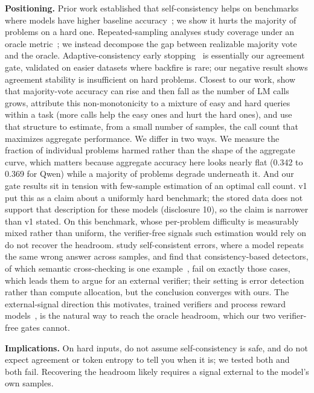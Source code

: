 \documentclass{article}
\begin{document}
\textbf{Positioning.} Prior work established that self-consistency helps on
benchmarks where models have higher baseline
accuracy~\citep{wang2023self}; we show it hurts the majority of problems on a
hard one. Repeated-sampling analyses study coverage under an oracle
metric~\citep{brown2024large}; we instead decompose the gap between realizable
majority vote and the oracle. Adaptive-consistency early
stopping~\citep{aggarwal2023adaptive} is essentially our agreement gate,
validated on easier datasets where backfire is rare; our negative result shows
agreement stability is insufficient on hard problems. Closest to our work,
\citet{chen2024more} show that majority-vote accuracy can rise and then fall
as the number of LM calls grows, attribute this non-monotonicity to a mixture
of easy and hard queries within a task (more calls help the easy ones and hurt
the hard ones), and use that structure to estimate, from a small number of
samples, the call count that maximizes aggregate performance. We differ in two
ways. We measure the fraction of individual problems harmed rather than the
shape of the aggregate curve, which matters because aggregate accuracy here
looks nearly flat (0.342 to 0.369 for Qwen) while a majority of problems
degrade underneath it. And our gate results sit in tension with few-sample
estimation of an optimal call count. v1 put this as a claim about a uniformly
hard benchmark; the stored data does not support that description for these
models (disclosure 10), so the claim is narrower than v1 stated. On this
benchmark, whose per-problem difficulty is measurably mixed rather than
uniform, the
verifier-free signals such estimation would rely on do not recover the
headroom. \citet{tan2025consistent} study self-consistent errors, where a
model repeats the same wrong answer across samples, and find that
consistency-based detectors, of which semantic cross-checking is one
example~\citep{zhang2023sac3}, fail on exactly those cases, which leads them to
argue for an external verifier; their setting is error detection rather than
compute allocation, but the conclusion converges with ours. The external-signal
direction this motivates, trained verifiers and process reward
models~\citep{cobbe2021training, lightman2023verify}, is the natural way to
reach the oracle headroom, which our two verifier-free gates cannot.

\textbf{Implications.} On hard inputs, do not assume self-consistency is safe,
and do not expect agreement or token entropy to tell you when it is; we tested
both and both fail. Recovering the headroom likely requires a signal external
to the model's own samples.
\end{document}

